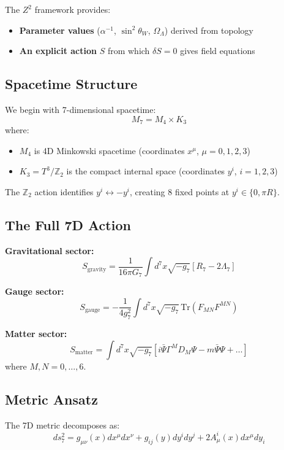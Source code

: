 \documentclass[11pt,a4paper]{article}
\theoremstyle{plain}
\theoremstyle{definition}
\theoremstyle{remark}
\newcommand{\thetaW}{\theta_W}
\newcommand{\OmegaL}{\Omega_\Lambda}
\newcommand{\Ztwo}{\mathbb{Z}_2}
\begin{document}
The $Z^2$ framework provides:
\begin{itemize}
  \item \textbf{Parameter values} ($\alpha^{-1}$, $\sin^2\thetaW$, $\OmegaL$) derived from topology
  \item \textbf{An explicit action} $S$ from which $\delta S = 0$ gives field equations
\end{itemize}

\subsection{Spacetime Structure}

We begin with 7-dimensional spacetime:
\[
M_7 = M_4 \times K_3
\]
where:
\begin{itemize}
  \item $M_4$ is 4D Minkowski spacetime (coordinates $x^\mu$, $\mu = 0,1,2,3$)
  \item $K_3 = T^3/\Ztwo$ is the compact internal space (coordinates $y^i$, $i = 1,2,3$)
\end{itemize}

The $\Ztwo$ action identifies $y^i \leftrightarrow -y^i$, creating 8 fixed points at $y^i \in \{0, \pi R\}$.

\subsection{The Full 7D Action}

\begin{center}
\end{center}

\textbf{Gravitational sector:}
\[
S_{\text{gravity}} = \frac{1}{16\pi G_7} \int d^7x \sqrt{-g_7} \left[ R_7 - 2\Lambda_7 \right]
\]

\textbf{Gauge sector:}
\[
S_{\text{gauge}} = -\frac{1}{4g_7^2} \int d^7x \sqrt{-g_7} \, \text{Tr}(F_{MN} F^{MN})
\]

\textbf{Matter sector:}
\[
S_{\text{matter}} = \int d^7x \sqrt{-g_7} \left[ i\bar{\Psi} \Gamma^M D_M \Psi - m\bar{\Psi}\Psi + \ldots \right]
\]
where $M,N = 0,\ldots,6$.

\subsection{Metric Ansatz}

The 7D metric decomposes as:
\[
ds_7^2 = g_{\mu\nu}(x) dx^\mu dx^\nu + g_{ij}(y) dy^i dy^j + 2A_\mu^i(x) dx^\mu dy_i
\]
\end{document}
